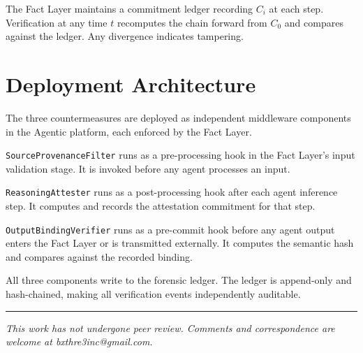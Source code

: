 \documentclass[12pt]{article}
\begin{document}
The Fact Layer maintains a commitment ledger recording $C_i$ at each step. Verification at any time $t$ recomputes the chain forward from $C_0$ and compares against the ledger. Any divergence indicates tampering.

\section{Deployment Architecture}
\label{sec:deployment-arch}

The three countermeasures are deployed as independent middleware components in the Agentic platform, each enforced by the Fact Layer.

\texttt{SourceProvenanceFilter} runs as a pre-processing hook in the Fact Layer's input validation stage. It is invoked before any agent processes an input.

\texttt{ReasoningAttester} runs as a post-processing hook after each agent inference step. It computes and records the attestation commitment for that step.

\texttt{OutputBindingVerifier} runs as a pre-commit hook before any agent output enters the Fact Layer or is transmitted externally. It computes the semantic hash and compares against the recorded binding.

All three components write to the forensic ledger. The ledger is append-only and hash-chained, making all verification events independently auditable.





\vspace{2em}
\hrule
\vspace{0.5em}
\noindent\small\textit{This work has not undergone peer review. Comments and correspondence are welcome at bxthre3inc@gmail.com.}
\end{document}
